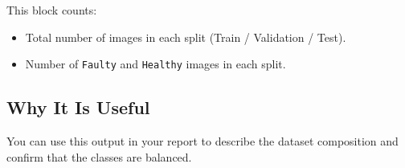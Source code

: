 \documentclass[12pt]{article}
\begin{document}
This block counts:
\begin{itemize}
    \item Total number of images in each split (Train / Validation / Test).
    \item Number of \texttt{Faulty} and \texttt{Healthy} images in each split.
\end{itemize}

\subsection*{Why It Is Useful}

You can use this output in your report to describe the dataset composition and confirm that the classes are balanced.
\end{document}
